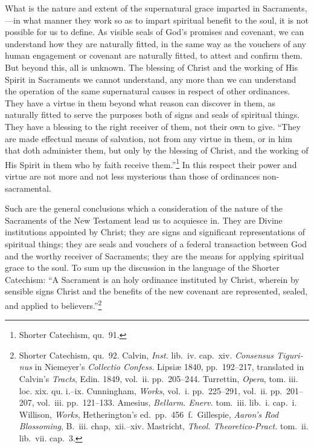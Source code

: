 \documentclass[
  english,
]{book}
\providecommand{\textlatin}{}
\renewcommand{\textlatin}[2][]{\foreignlanguage{latin}{#2}}
\begin{document}
What is the nature and extent of the supernatural grace imparted in Sacraments,---in what manner they work so as to impart spiritual benefit to the soul, it is not possible for us to define. As visible seals of God's promises and covenant, we can understand how they are naturally fitted, in the same way as the vouchers of any human engagement or covenant are naturally fitted, to attest and confirm them. But beyond this, all is unknown. The blessing of Christ and the working of His Spirit in Sacraments we cannot understand, any more than we can understand the operation of the same supernatural causes in respect of other ordinances. They have a virtue in them beyond what reason can discover in them, as naturally fitted to serve the purposes both of signs and seals of spiritual things. They have a blessing to the right receiver of them, not their own to give. ``They are made effectual means of salvation, not from any virtue in them, or in him that doth administer them, but only by the blessing of Christ, and the working of His Spirit in them who by faith receive them.''\footnote{Shorter Catechism, qu.~91.} In this respect their power and virtue are not more and not less mysterious than those of ordinances non-sacramental.

Such are the general conclusions which a consideration of the nature of the Sacraments of the New Testament lead us to acquiesce in. They are Divine institutions appointed by Christ; they are signs and significant representations of spiritual things; they are seals and vouchers of a federal transaction between God and the worthy receiver of Sacraments; they are the means for applying spiritual grace to the soul. To sum up the discussion in the language of the Shorter Catechism: ``A Sacrament is an holy ordinance instituted by Christ, wherein by sensible signs Christ and the benefits of the new covenant are represented, sealed, and applied to believers.''\footnote{Shorter Catechism, qu.~92. Calvin, \emph{Inst.} lib.~iv. cap.~xiv. \textlatin{\emph{Consensus Tigurinus}} in Niemeyer's \textlatin{\emph{Collectio Confess.} Lipsiæ} 1840, pp.~192--217, translated in Calvin's \emph{Tracts}, Edin. 1849, vol.~ii. pp.~205--244. Turrettin, \emph{Opera}, tom. iii. loc. xix. qu. i.--ix. Cunningham, \emph{Works}, vol.~i. pp.~225--291, vol.~ii. pp.~201--207, vol.~iii. pp.~121--133. Amesius, \emph{Bellarm. Enerv.} tom.~iii. lib.~i. cap.~i. Willison, \emph{Works}, Hetherington's ed.~pp.~456~f.~Gillespie, \emph{Aaron's Rod Blossoming}, B.~iii. chap,~xii.--xiv. Mastricht, \emph{Theol. Theoretico-Pract.} tom.~ii. lib.~vii. cap.~3.}
\end{document}
